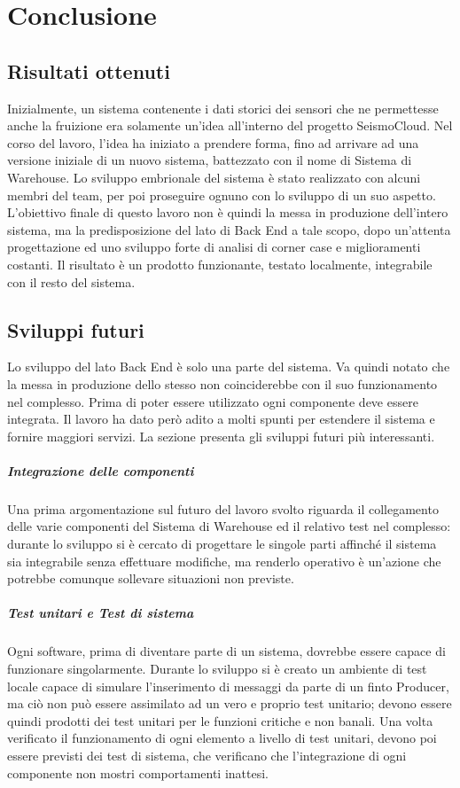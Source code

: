 \chapter{Conclusione}

\section{Risultati ottenuti}
Inizialmente, un sistema contenente i dati storici dei sensori che ne permettesse anche la fruizione era solamente un'idea all'interno del progetto SeismoCloud. Nel corso del lavoro, l'idea ha iniziato a prendere forma, fino ad arrivare ad una versione iniziale di un nuovo sistema, battezzato con il nome di Sistema di Warehouse. Lo sviluppo embrionale del sistema è stato realizzato con alcuni membri del team, per poi proseguire ognuno con lo sviluppo di un suo aspetto. L'obiettivo finale di questo lavoro non è quindi la messa in produzione dell'intero sistema, ma la predisposizione del lato di Back End a tale scopo, dopo un'attenta progettazione ed uno sviluppo forte di analisi di corner case e miglioramenti costanti. Il risultato è un prodotto funzionante, testato localmente, integrabile con il resto del sistema.

\section{Sviluppi futuri}
Lo sviluppo del lato Back End è solo una parte del sistema. Va quindi notato che la messa in produzione dello stesso non coinciderebbe con il suo funzionamento nel complesso. Prima di poter essere utilizzato ogni componente deve essere integrata. Il lavoro ha dato però adito a molti spunti per estendere il sistema e fornire maggiori servizi. La sezione presenta gli sviluppi futuri più interessanti.

\paragraph{Integrazione delle componenti}
Una prima argomentazione sul futuro del lavoro svolto riguarda il collegamento delle varie componenti del Sistema di Warehouse ed il relativo test nel complesso: durante lo sviluppo si è cercato di progettare le singole parti affinché il sistema sia integrabile senza effettuare modifiche, ma renderlo operativo è un'azione che potrebbe comunque sollevare situazioni non previste. 

\paragraph{Test unitari e Test di sistema}
Ogni software, prima di diventare parte di un sistema, dovrebbe essere capace di funzionare singolarmente. Durante lo sviluppo si è creato un ambiente di test locale capace di simulare l'inserimento di messaggi da parte di un finto Producer, ma ciò non può essere assimilato ad un vero e proprio test unitario; devono essere quindi prodotti dei test unitari per le funzioni critiche e non banali. Una volta verificato il funzionamento di ogni elemento a livello di test unitari, devono poi essere previsti dei test di sistema, che verificano che l'integrazione di ogni componente non mostri comportamenti inattesi.

